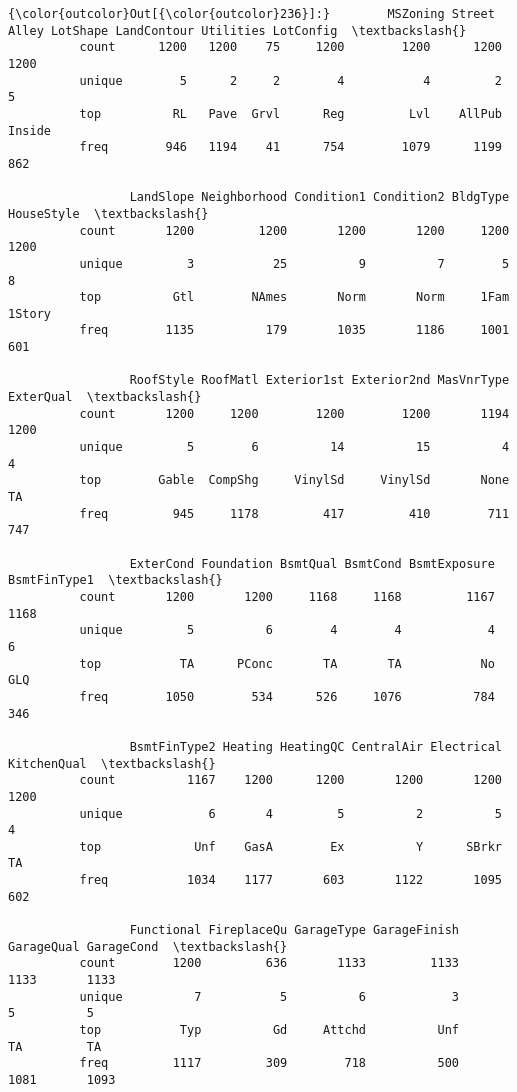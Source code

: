 \documentclass[11pt]{article}
\begin{document}
\begin{Verbatim}[commandchars=\\\{\}]
{\color{outcolor}Out[{\color{outcolor}236}]:}        MSZoning Street Alley LotShape LandContour Utilities LotConfig  \textbackslash{}
          count      1200   1200    75     1200        1200      1200      1200   
          unique        5      2     2        4           4         2         5   
          top          RL   Pave  Grvl      Reg         Lvl    AllPub    Inside   
          freq        946   1194    41      754        1079      1199       862   
          
                 LandSlope Neighborhood Condition1 Condition2 BldgType HouseStyle  \textbackslash{}
          count       1200         1200       1200       1200     1200       1200   
          unique         3           25          9          7        5          8   
          top          Gtl        NAmes       Norm       Norm     1Fam     1Story   
          freq        1135          179       1035       1186     1001        601   
          
                 RoofStyle RoofMatl Exterior1st Exterior2nd MasVnrType ExterQual  \textbackslash{}
          count       1200     1200        1200        1200       1194      1200   
          unique         5        6          14          15          4         4   
          top        Gable  CompShg     VinylSd     VinylSd       None        TA   
          freq         945     1178         417         410        711       747   
          
                 ExterCond Foundation BsmtQual BsmtCond BsmtExposure BsmtFinType1  \textbackslash{}
          count       1200       1200     1168     1168         1167         1168   
          unique         5          6        4        4            4            6   
          top           TA      PConc       TA       TA           No          GLQ   
          freq        1050        534      526     1076          784          346   
          
                 BsmtFinType2 Heating HeatingQC CentralAir Electrical KitchenQual  \textbackslash{}
          count          1167    1200      1200       1200       1200        1200   
          unique            6       4         5          2          5           4   
          top             Unf    GasA        Ex          Y      SBrkr          TA   
          freq           1034    1177       603       1122       1095         602   
          
                 Functional FireplaceQu GarageType GarageFinish GarageQual GarageCond  \textbackslash{}
          count        1200         636       1133         1133       1133       1133   
          unique          7           5          6            3          5          5   
          top           Typ          Gd     Attchd          Unf         TA         TA   
          freq         1117         309        718          500       1081       1093   
          

\end{Verbatim}
\end{document}
